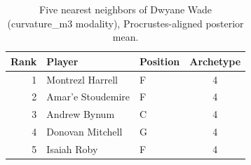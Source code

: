 \begin{table}[htbp]
  \centering\small
  \begin{tabular}{rllc}
    \toprule
    Rank & Player & Position & Archetype \\
    \midrule
    1 & Montrezl Harrell & F & 4 \\
    2 & Amar'e Stoudemire & F & 4 \\
    3 & Andrew Bynum & C & 4 \\
    4 & Donovan Mitchell & G & 4 \\
    5 & Isaiah Roby & F & 4 \\
    \bottomrule
  \end{tabular}
  \caption{Five nearest neighbors of Dwyane Wade (curvature_m3 modality), Procrustes-aligned posterior mean.}
  \label{tab:Dwyane_Wade_neighbors_curvature_m3}
\end{table}

